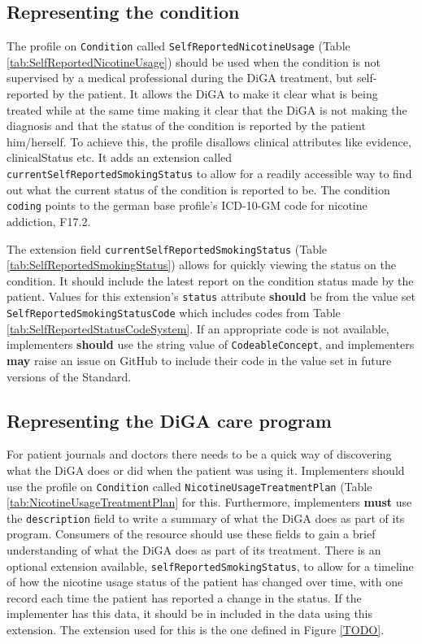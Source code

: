 \documentclass[12px]{report}
\def\code#1{\texttt{#1}} %
\newcommand{\tabcondition}{}
\newcommand{\tabplan}{}
\newcommand{\tabstatusext}{}
\newcommand{\tabstatuscs}{}
\begin{document}
\subsection{Representing the condition}
\tabcondition

The profile on \code{Condition} called \code{SelfReportedNicotineUsage} (Table \ref{tab:SelfReportedNicotineUsage}) should be used when the condition is not supervised by a medical professional during the DiGA treatment, but self-reported by the patient.
It allows the DiGA to make it clear what is being treated while at the same time making it clear that the DiGA is not making the diagnosis and that the status of the condition is reported by the patient him/herself. 
To achieve this, the profile disallows clinical attributes like evidence, clinicalStatus etc. It adds an extension called \code{currentSelfReportedSmokingStatus} to allow for a readily accessible way to find out what the current status of the condition is reported to be.
The condition \code{coding} points to the german base profile's \cite{debasis} ICD-10-GM code \cite{icd} for nicotine addiction, F17.2.

\tabstatuscs
\tabstatusext

The extension field \code{currentSelfReportedSmokingStatus} (Table \ref{tab:SelfReportedSmokingStatus}) allows for quickly viewing the status on the condition. It should include the latest report on the condition status made by the patient.
Values for this extension's \code{status} attribute \textbf{should} be from the value set \code{SelfReportedSmokingStatusCode} which includes codes from Table \ref{tab:SelfReportedStatusCodeSystem}. If an appropriate code is not available, implementers \textbf{should} use the string value of \code{CodeableConcept}, 
and implementers \textbf{may} raise an issue on GitHub \cite{github} to include their code in the value set in future versions of the Standard.

\subsection{Representing the DiGA care program}
\tabplan
For patient journals and doctors there needs to be a quick way of discovering what the DiGA does or did when the patient was using it. 
Implementers should use the profile on \code{Condition} called \code{NicotineUsageTreatmentPlan} (Table \ref{tab:NicotineUsageTreatmentPlan} for this. 
Furthermore, implementers \textbf{must} use the \code{description} field to write a summary of what the DiGA does as part of its program.
Consumers of the resource should use these fields to gain a brief understanding of what the DiGA does as part of its treatment.
There is an optional extension available, \code{selfReportedSmokingStatus}, to allow for a timeline of how the nicotine usage status of the patient has changed over time, with one record each time the patient has reported a change in the status. 
If the implementer has this data, it should be in included in the data using this extension. The extension used for this is the one defined in Figure \ref{TODO}.
\end{document}
